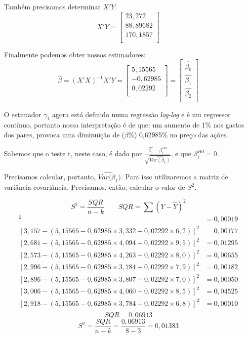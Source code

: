 \documentclass[]{ufpe-exercises}
\begin{document}
\begin{questions}
\begin{parts}
\begin{solution}
			Também precisamos determinar \(X'Y\):
			\[
				X'Y =
				\begin{bmatrix}
					23,272   \\
					88,89682 \\
					170,1857 \\
				\end{bmatrix}
			\]

			Finalmente podemos obter nossos estimadores:
			\[
				\hat{\beta} = (X'X)^{-1}X'Y =
				\begin{bmatrix}
					5,15565  \\
					-0,62985 \\
					0,02292  \\
				\end{bmatrix} =
				\begin{bmatrix}
					\hat{\beta_{0}} \\
					\hat{\beta_{1}} \\
					\hat{\beta_{2}} \\
				\end{bmatrix}
			\]

			O estimador \(\gamma_{1}\) agora está definido numa regressão \textit{log-log} e é um regressor contínuo, portanto nossa interpretação é de que: um aumento de 1\% nos gastos dos pares, provoca uma diminuição de (\(\beta\%\)) 0,62985\% no preço das ações.

			Sabemos que o teste t, neste caso, é dado por \(\frac{\hat{\beta_{1}} - \beta^{H0}_{1}}{\sqrt{\widehat{Var(\beta_{1})}}}\), e que \(\beta^{H0}_{1} = 0\).

			Precisamos calcular, portanto, \(\widehat{Var(\beta_{1}})\). Para isso utilizaremos a matriz de variância-covariância. Precisamos, então, calcular o valor de \(S^{2}\).

			\[
				S^{2} = \frac{SQR}{n - k} \qquad
				SQR = \sum (Y - \hat{Y})^{2}
			\]
			\begin{align*}
				[3.045 - (5,15565 - 0,62985 \times 3,555 + 0,02292 \times 5,0 )]^{2} & = 0,00019 \\
				[3,157 - (5,15565 - 0,62985 \times 3,332 + 0,02292 \times 6,2 )]^{2} & = 0,00177 \\
				[2,681 - (5,15565 - 0,62985 \times 4,094 + 0,02292 \times 9,5 )]^{2} & = 0,01295 \\
				[2,573 - (5,15565 - 0,62985 \times 4,263 + 0,02292 \times 8,0 )]^{2} & = 0,00655 \\
				[2,996 - (5,15565 - 0,62985 \times 3,784 + 0,02292 \times 7,9 )]^{2} & = 0,00182 \\
				[2,896 - (5,15565 - 0,62985 \times 3,807 + 0,02292 \times 7,0 )]^{2} & = 0,00050 \\
				[3,006 - (5,15565 - 0,62985 \times 4,060 + 0,02292 \times 8,5 )]^{2} & = 0,04525 \\
				[2,918 - (5,15565 - 0,62985 \times 3,784 + 0,02292 \times 6,8 )]^{2} & = 0,00010 \\
			\end{align*}
			\[ SQR = 0,06913 \]
			\[ S^{2} = \frac{SQR}{n - k} = \frac{0,06913}{8 - 3} = 0,01383 \]


\end{solution}
\end{parts}
\end{questions}
\end{document}

